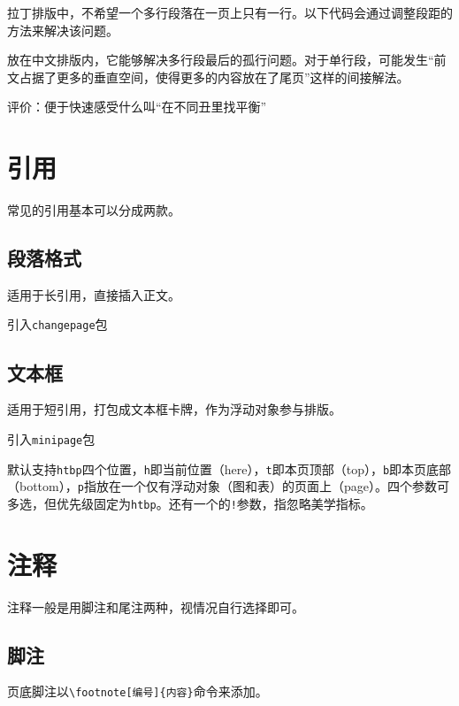 \documentclass[10pt,openany]{book}
\begin{document}
拉丁排版中，不希望一个多行段落在一页上只有一行。以下代码会通过调整段距的方法来解决该问题。



放在中文排版内，它能够解决多行段最后的孤行问题。对于单行段，可能发生“前文占据了更多的垂直空间，使得更多的内容放在了尾页”这样的间接解法。

评价：便于快速感受什么叫“在不同丑里找平衡”

\chapter{引用}

常见的引用基本可以分成两款。

\section{段落格式}

适用于长引用，直接插入正文。

引入\texttt{changepage}包



\section{文本框}

适用于短引用，打包成文本框卡牌，作为浮动对象参与排版。

引入\texttt{minipage}包



默认支持\texttt{htbp}四个位置，\texttt{h}即当前位置（here），\texttt{t}即本页顶部（top），\texttt{b}即本页底部（bottom），\texttt{p}指放在一个仅有浮动对象（图和表）的页面上（page）。四个参数可多选，但优先级固定为\texttt{htbp}。还有一个的\texttt{!}参数，指忽略美学指标。

\chapter{注释}

注释一般是用脚注和尾注两种，视情况自行选择即可。

\section{脚注}

页底脚注以\texttt{\textbackslash{}footnote[编号]\{内容\}}命令来添加。
\end{document}
